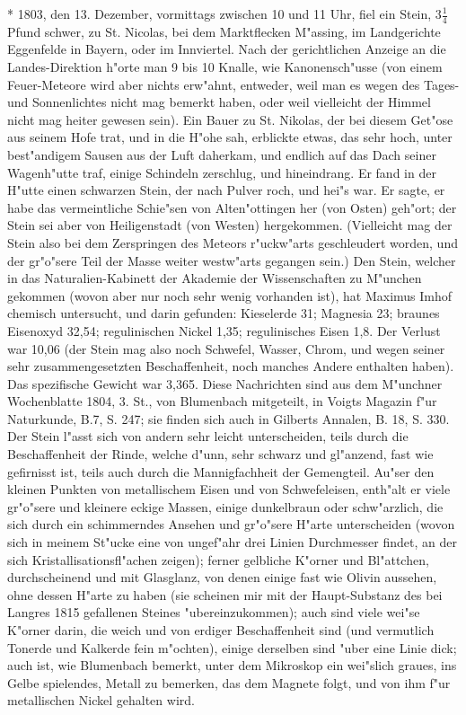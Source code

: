 \documentclass[a4paper, 11pt, oneside, polutonikogreek, german]{article}
\begin{document}
* 1803, den 13. Dezember, vormittags zwischen 10 und 11 Uhr, fiel ein Stein, $\mathfrak{3\frac{1}{4}}$ Pfund schwer, zu St. Nicolas, bei dem Marktflecken M"assing, im Landgerichte Eggenfelde in Bayern, oder im Innviertel. Nach der gerichtlichen Anzeige an die Landes-Direktion h"orte man 9 bis 10 Knalle, wie Kanonensch"usse (von einem Feuer-Meteore wird aber nichts erw"ahnt, entweder, weil man es wegen des Tages- und Sonnenlichtes nicht mag bemerkt haben, oder weil vielleicht der Himmel nicht mag heiter gewesen sein). Ein Bauer zu St. Nikolas, der bei diesem Get"ose aus seinem Hofe trat, und in die H"ohe sah, erblickte etwas, das sehr hoch, unter best"andigem Sausen aus der Luft daherkam, und endlich auf das Dach seiner Wagenh"utte traf, einige Schindeln zerschlug, und hineindrang. Er fand in der H"utte einen schwarzen Stein, der nach Pulver roch, und hei"s war. Er sagte, er habe das vermeintliche Schie"sen von Alten"ottingen her (von Osten) geh"ort; der Stein sei aber von Heiligenstadt (von Westen) hergekommen. (Vielleicht mag der Stein also bei dem Zerspringen des Meteors r"uckw"arts geschleudert worden, und der gr"o"sere Teil der Masse weiter westw"arts gegangen sein.) Den Stein, welcher in das Naturalien-Kabinett der Akademie der Wissenschaften zu M"unchen gekommen (wovon aber nur noch sehr wenig vorhanden ist), hat Maximus Imhof chemisch untersucht, und darin gefunden: Kieselerde 31; Magnesia 23; braunes Eisenoxyd 32,54; regulinischen Nickel 1,35; regulinisches Eisen 1,8. Der Verlust war 10,06 (der Stein mag also noch Schwefel, Wasser, Chrom, und wegen seiner sehr zusammengesetzten Beschaffenheit, noch manches Andere enthalten haben). Das spezifische Gewicht war 3,365. Diese Nachrichten sind aus dem M"unchner Wochenblatte 1804, 3. St., von Blumenbach mitgeteilt, in Voigts Magazin f"ur Naturkunde, B.7, S. 247; sie finden sich auch in Gilberts Annalen, B. 18, S. 330. Der Stein l"asst sich von andern sehr leicht unterscheiden, teils durch die Beschaffenheit der Rinde, welche d"unn, sehr schwarz und gl"anzend, fast wie gefirnisst ist, teils auch durch die Mannigfachheit der Gemengteil. Au"ser den kleinen Punkten von metallischem Eisen und von Schwefeleisen, enth"alt er viele gr"o"sere und kleinere eckige Massen, einige dunkelbraun oder schw"arzlich, die sich durch ein schimmerndes Ansehen und gr"o"sere H"arte unterscheiden (wovon sich in meinem St"ucke eine von ungef"ahr drei Linien Durchmesser findet, an der sich Kristallisationsfl"achen zeigen); ferner gelbliche K"orner und Bl"attchen, durchscheinend und mit Glasglanz, von denen einige fast wie Olivin aussehen, ohne dessen H"arte zu haben (sie scheinen mir mit der Haupt-Substanz des bei Langres 1815 gefallenen Steines "ubereinzukommen); auch sind viele wei"se K"orner darin, die weich und von erdiger Beschaffenheit sind (und vermutlich Tonerde und Kalkerde fein m"ochten), einige derselben sind "uber eine Linie dick; auch ist, wie Blumenbach bemerkt, unter dem Mikroskop ein wei"slich graues, ins Gelbe spielendes, Metall zu bemerken, das dem Magnete folgt, und von ihm f"ur metallischen Nickel gehalten wird.
\end{document}
